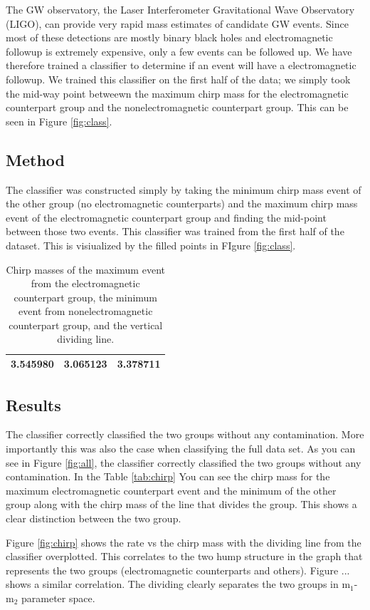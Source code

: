 The GW observatory, the Laser Interferometer Gravitational Wave Observatory (LIGO), can provide very rapid mass estimates of candidate GW events. Since most of these detections are mostly binary black holes and electromagnetic followup is extremely expensive, only a few events can be followed up. We have therefore trained a classifier to determine if an event will have a electromagnetic followup. We trained this classifier on the first half of the data; we simply took the mid-way point betweewn the maximum chirp mass for the electromagnetic counterpart group and the nonelectromagnetic counterpart group. This can be seen in Figure \ref{fig:class}.

\subsection{Method}
The classifier was constructed simply by taking the minimum chirp mass event of the other group (no electromagnetic counterparts) and the maximum chirp mass event of the electromagnetic counterpart group and finding the mid-point between those two events. This classifier was trained from the first half of the dataset. This is visiualized by the filled points in FIgure \ref{fig:class}.

\begin{table}[ht]
\caption{Chirp masses of the maximum event from the electromagnetic counterpart group, the minimum event from nonelectromagnetic counterpart group, and the vertical dividing line.}
\centering
\begin{tabular}{c c c}

\hline\hline
3.545980 & 3.065123 & 3.378711\\
\hline\hline
\end{tabular}
\label{tab:mass}
\end{table}

\subsection{Results}
The classifier correctly classified the two groups without any contamination. More importantly this was also the case when classifying the full data set. As you can see in Figure \ref{fig:all}, the classifier correctly classified the two groups without any contamination. In the Table \ref{tab:chirp} You can see the chirp mass for the maximum electromagnetic counterpart event and the minimum of the other group along with the chirp mass of the line that divides the group. This shows a clear distinction between the two group.



Figure \ref{fig:chirp} shows the rate vs the chirp mass with the dividing line from the classifier overplotted. This correlates to the two hump structure in the graph that represents the two groups (electromagnetic counterparts and others). Figure ... shows a similar correlation. The dividing clearly separates the two groups in  m$_{1}$-m$_{2}$ parameter space.